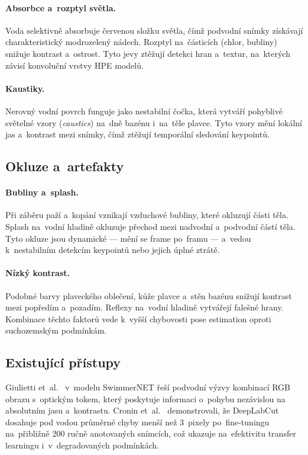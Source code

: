 \paragraph{Absorbce a~rozptyl světla.}
Voda selektivně absorbuje červenou složku světla, čímž podvodní snímky získávají charakteristický modrozelený nádech. Rozptyl na~částicích (chlor, bubliny) snižuje kontrast a~ostrost. Tyto jevy ztěžují detekci hran a~textur, na~kterých závisí konvoluční vrstvy HPE modelů.

\paragraph{Kaustiky.}
Nerovný vodní povrch funguje jako nestabilní čočka, která vytváří pohyblivé světelné vzory (\textit{caustics}) na~dně bazénu i~na~těle plavce. Tyto vzory mění lokální jas a~kontrast mezi snímky, čímž ztěžují temporální sledování keypointů.

\subsection{Okluze a~artefakty}

\paragraph{Bubliny a~splash.}
Při záběru paží a~kopání vznikají vzduchové bubliny, které okluzují části těla. Splash na~vodní hladině okluzuje přechod mezi nadvodní a~podvodní částí těla. Tyto okluze jsou dynamické --- mění se frame po~framu --- a~vedou k~nestabilním detekcím keypointů nebo jejich úplné ztrátě.

\paragraph{Nízký kontrast.}
Podobné barvy plaveckého oblečení, kůže plavce a~stěn bazénu snižují kontrast mezi popředím a~pozadím. Reflexy na~vodní hladině vytvářejí falešné hrany. Kombinace těchto faktorů vede k~vyšší chybovosti pose estimation oproti suchozemským podmínkám.

\subsection{Existující přístupy}

Giulietti et~al.~\cite{giulietti2023} v~modelu SwimmerNET řeší podvodní výzvy kombinací RGB obrazu s~optickým tokem, který poskytuje informaci o~pohybu nezávislou na absolutním jasu a~kontrastu. Cronin et~al.~\cite{cronin2019underwater} demonstrovali, že DeepLabCut~\cite{mathis2018deeplabcut} dosahuje pod vodou průměrné chyby menší než 3~pixely po~fine-tuningu na~přibližně 200 ručně anotovaných snímcích, což ukazuje na~efektivitu transfer learningu i~v~degradovaných podmínkách.

